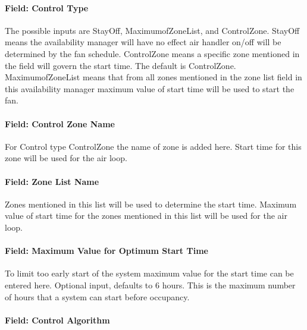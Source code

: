 \paragraph{Field: Control Type}\label{field-control-type-003}

The possible inputs are StayOff, MaximumofZoneList, and ControlZone. StayOff means the availability manager will have no effect air handler on/off will be determined by the fan schedule. ControlZone means a specific zone mentioned in the field will govern the start time. The default is ControlZone. MaximumofZoneList means that from all zones mentioned in the zone list field in this availability manager maximum value of start time will be used to start the fan.

\paragraph{Field: Control Zone Name}\label{field-control-zone-name-1-000}

For Control type ControlZone the name of zone is added here. Start time for this zone will be used for the air loop.

\paragraph{Field: Zone List Name}\label{field-zone-list-name}

Zones mentioned in this list will be used to determine the start time. Maximum value of start time for the zones mentioned in this list will be used for the air loop.

\paragraph{Field: Maximum Value for Optimum Start Time}\label{field-maximum-value-for-optimum-start-time}

To limit too early start of the system maximum value for the start time can be entered here. Optional input, defaults to 6 hours. This is the maximum number of hours that a system can start before occupancy.

\paragraph{Field: Control Algorithm}\label{field-control-algorithm}

